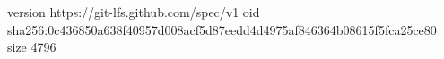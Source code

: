 version https://git-lfs.github.com/spec/v1
oid sha256:0c436850a638f40957d008acf5d87eedd4d4975af846364b08615f5fca25ce80
size 4796
